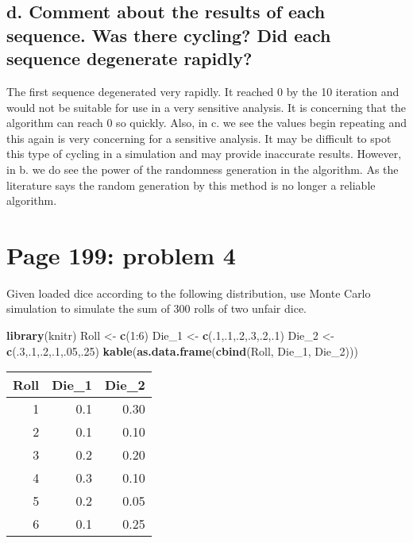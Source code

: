 \documentclass[]{article}
\newenvironment{Shaded}{\begin{snugshade}}{\end{snugshade}}
\newcommand{\KeywordTok}[1]{\textcolor[rgb]{0.13,0.29,0.53}{\textbf{{#1}}}}
\newcommand{\DecValTok}[1]{\textcolor[rgb]{0.00,0.00,0.81}{{#1}}}
\newcommand{\StringTok}[1]{\textcolor[rgb]{0.31,0.60,0.02}{{#1}}}
\newcommand{\NormalTok}[1]{{#1}}
\begin{document}
\subsection{d. Comment about the results of each sequence. Was there
cycling? Did each sequence degenerate
rapidly?}\label{d.-comment-about-the-results-of-each-sequence.-was-there-cycling-did-each-sequence-degenerate-rapidly}

The first sequence degenerated very rapidly. It reached 0 by the 10
iteration and would not be suitable for use in a very sensitive
analysis. It is concerning that the algorithm can reach 0 so quickly.
Also, in c. we see the values begin repeating and this again is very
concerning for a sensitive analysis. It may be difficult to spot this
type of cycling in a simulation and may provide inaccurate results.
However, in b. we do see the power of the randomness generation in the
algorithm. As the literature says the random generation by this method
is no longer a reliable algorithm.

\newpage

\section{Page 199: problem 4}\label{page-199-problem-4}

Given loaded dice according to the following distribution, use Monte
Carlo simulation to simulate the sum of 300 rolls of two unfair dice.

\begin{Shaded}
\begin{Highlighting}[]
\KeywordTok{library}\NormalTok{(knitr)}
\NormalTok{Roll <-}\StringTok{ }\KeywordTok{c}\NormalTok{(}\DecValTok{1}\NormalTok{:}\DecValTok{6}\NormalTok{)}
\NormalTok{Die_1 <-}\StringTok{ }\KeywordTok{c}\NormalTok{(.}\DecValTok{1}\NormalTok{,.}\DecValTok{1}\NormalTok{,.}\DecValTok{2}\NormalTok{,.}\DecValTok{3}\NormalTok{,.}\DecValTok{2}\NormalTok{,.}\DecValTok{1}\NormalTok{)}
\NormalTok{Die_2 <-}\StringTok{ }\KeywordTok{c}\NormalTok{(.}\DecValTok{3}\NormalTok{,.}\DecValTok{1}\NormalTok{,.}\DecValTok{2}\NormalTok{,.}\DecValTok{1}\NormalTok{,.}\DecValTok{05}\NormalTok{,.}\DecValTok{25}\NormalTok{)}
\KeywordTok{kable}\NormalTok{(}\KeywordTok{as.data.frame}\NormalTok{(}\KeywordTok{cbind}\NormalTok{(Roll, Die_1, Die_2)))}
\end{Highlighting}
\end{Shaded}

\begin{longtable}[]{@{}rrr@{}}
\toprule
Roll & Die\_1 & Die\_2\tabularnewline
\midrule
\endhead
1 & 0.1 & 0.30\tabularnewline
2 & 0.1 & 0.10\tabularnewline
3 & 0.2 & 0.20\tabularnewline
4 & 0.3 & 0.10\tabularnewline
5 & 0.2 & 0.05\tabularnewline
6 & 0.1 & 0.25\tabularnewline
\bottomrule
\end{longtable}
\end{document}
